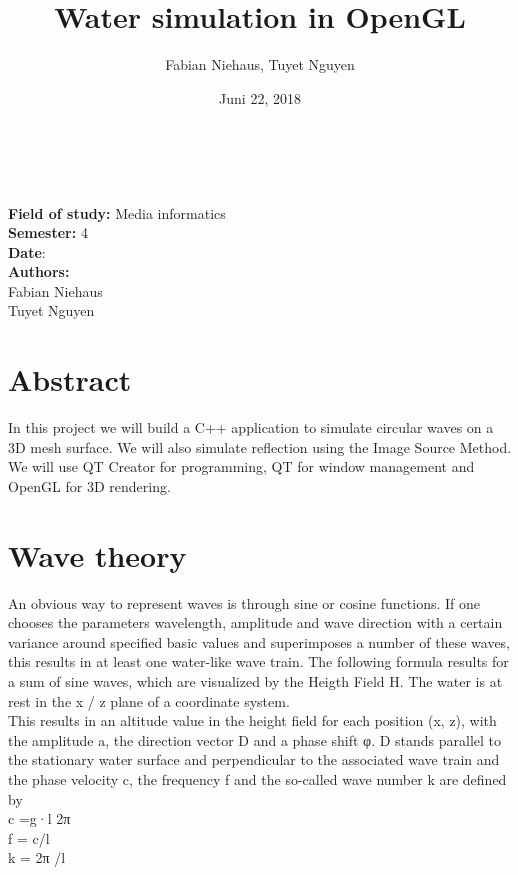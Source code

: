 \documentclass[12pt,a4paper]{scrartcl}
\title{Water simulation in OpenGL}
\author{Fabian Niehaus, Tuyet Nguyen}
\date{Juni 22, 2018}
\begin{document}
\begin{titlepage}
	\centering
	\ \\[2cm]
	{\huge\textbf{\@title}} 
	\\[3cm]
	\large
	\textbf{Field of study:} Media informatics \\
	\textbf{Semester:} 4
	\\[2cm]
	\textbf{Date}: \@date
	\\[2cm]
	\textbf {Authors:}
	\\Fabian Niehaus
	\\Tuyet Nguyen
\end{titlepage}

\newpage
\setcounter{page}{0}
\tableofcontents
\newpage
\listoffigures

\newpage
\ofoot[]{\pagemark}
\normalsize

\section{Abstract}
In this project we will build a C++ application to simulate circular waves on a 3D mesh surface. We will also simulate reflection using the Image Source Method. We will use QT Creator for programming, QT for window management and OpenGL for 3D rendering.

\section{Wave theory}
An obvious way to represent waves is through sine or cosine functions. If one chooses the parameters wavelength, amplitude and wave direction with a certain variance around specified basic values and superimposes a number of these waves, this results in at least one water-like wave train. The following formula results for a sum of sine waves, which are visualized by the Heigth Field H. The water is at rest in the x / z plane of a coordinate system.\\

This results in an altitude value in the height field for each position (x, z), with the amplitude a, the direction vector D and a phase shift φ. D stands parallel to the stationary water surface and perpendicular to the associated wave train and the phase velocity c, the frequency f and the so-called wave number k are defined by \\

c =g·l 2π \\
f = c/l\\
k = 2π /l\\
\end{document}
